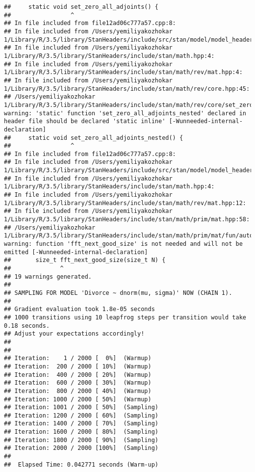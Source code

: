 \documentclass[]{article}
\begin{document}
\begin{verbatim}
##     static void set_zero_all_adjoints() {
##                 ^
## In file included from file12ad06c777a57.cpp:8:
## In file included from /Users/yemiliyakozhokar 1/Library/R/3.5/library/StanHeaders/include/src/stan/model/model_header.hpp:4:
## In file included from /Users/yemiliyakozhokar 1/Library/R/3.5/library/StanHeaders/include/stan/math.hpp:4:
## In file included from /Users/yemiliyakozhokar 1/Library/R/3.5/library/StanHeaders/include/stan/math/rev/mat.hpp:4:
## In file included from /Users/yemiliyakozhokar 1/Library/R/3.5/library/StanHeaders/include/stan/math/rev/core.hpp:45:
## /Users/yemiliyakozhokar 1/Library/R/3.5/library/StanHeaders/include/stan/math/rev/core/set_zero_all_adjoints_nested.hpp:17:17: warning: 'static' function 'set_zero_all_adjoints_nested' declared in header file should be declared 'static inline' [-Wunneeded-internal-declaration]
##     static void set_zero_all_adjoints_nested() {
##                 ^
## In file included from file12ad06c777a57.cpp:8:
## In file included from /Users/yemiliyakozhokar 1/Library/R/3.5/library/StanHeaders/include/src/stan/model/model_header.hpp:4:
## In file included from /Users/yemiliyakozhokar 1/Library/R/3.5/library/StanHeaders/include/stan/math.hpp:4:
## In file included from /Users/yemiliyakozhokar 1/Library/R/3.5/library/StanHeaders/include/stan/math/rev/mat.hpp:12:
## In file included from /Users/yemiliyakozhokar 1/Library/R/3.5/library/StanHeaders/include/stan/math/prim/mat.hpp:58:
## /Users/yemiliyakozhokar 1/Library/R/3.5/library/StanHeaders/include/stan/math/prim/mat/fun/autocorrelation.hpp:17:14: warning: function 'fft_next_good_size' is not needed and will not be emitted [-Wunneeded-internal-declaration]
##       size_t fft_next_good_size(size_t N) {
##              ^
## 19 warnings generated.
## 
## SAMPLING FOR MODEL 'Divorce ~ dnorm(mu, sigma)' NOW (CHAIN 1).
## 
## Gradient evaluation took 1.8e-05 seconds
## 1000 transitions using 10 leapfrog steps per transition would take 0.18 seconds.
## Adjust your expectations accordingly!
## 
## 
## Iteration:    1 / 2000 [  0%]  (Warmup)
## Iteration:  200 / 2000 [ 10%]  (Warmup)
## Iteration:  400 / 2000 [ 20%]  (Warmup)
## Iteration:  600 / 2000 [ 30%]  (Warmup)
## Iteration:  800 / 2000 [ 40%]  (Warmup)
## Iteration: 1000 / 2000 [ 50%]  (Warmup)
## Iteration: 1001 / 2000 [ 50%]  (Sampling)
## Iteration: 1200 / 2000 [ 60%]  (Sampling)
## Iteration: 1400 / 2000 [ 70%]  (Sampling)
## Iteration: 1600 / 2000 [ 80%]  (Sampling)
## Iteration: 1800 / 2000 [ 90%]  (Sampling)
## Iteration: 2000 / 2000 [100%]  (Sampling)
## 
##  Elapsed Time: 0.042771 seconds (Warm-up)

\end{verbatim}
\end{document}
